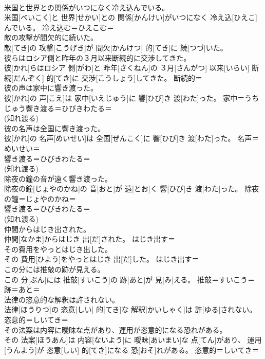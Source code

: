 \documentclass[8pt]{extreport}
\begin{document}
\begin{CJK}{UTF8}{min}
\\	米国と世界との関係がいつになく冷え込んでいる。	
\\	米国[べいこく]と 世界[せかい]との 関係[かんけい]がいつになく 冷え込[ひえこ]んでいる。	冷え込む＝ひえこむ＝ 
\\	敵の攻撃が間欠的に続いた。	
\\	敵[てき]の 攻撃[こうげき]が 間欠[かんけつ] 的[てき]に 続[つづ]いた。	
\\	彼らはロシア側と昨年の３月以来断続的に交渉してきた。	
\\	彼[かれ]らはロシア 側[がわ]と 昨年[さくねん]の ３月[さんがつ] 以来[いらい] 断続[だんぞく] 的[てき]に 交渉[こうしょう]してきた。	断続的＝ 
\\	彼の声は家中に響き渡った。	
\\	彼[かれ]の 声[こえ]は 家中[いえじゅう]に 響[ひび]き 渡[わた]った。	家中＝うちじゅう響き渡る＝ひびきわたる＝ 
\\	(知れ渡る)
\\	彼の名声は全国に響き渡った。	
\\	彼[かれ]の 名声[めいせい]は 全国[ぜんこく]に 響[ひび]き 渡[わた]った。	名声＝めいせい＝ 
\\	響き渡る＝ひびきわたる＝ 
\\	(知れ渡る)
\\	除夜の鐘の音が遠く響き渡った。	
\\	除夜の鐘[じょやのかね]の 音[おと]が 遠[とお]く 響[ひび]き 渡[わた]った。	除夜の鐘＝じょやのかね＝ 
\\	響き渡る＝ひびきわたる＝ 
\\	(知れ渡る)
\\	仲間からはじき出された。	
\\	仲間[なかま]からはじき 出[だ]された。	はじき出す＝ 
\\	その費用をやっとはじき出した。	
\\	その 費用[ひよう]をやっとはじき 出[だ]した。	はじき出す＝ 
\\	この分には推敲の跡が見える。	
\\	この 分[ぶん]には 推敲[すいこう]の 跡[あと]が 見[み]える。	推敲＝すいこう＝ 
\\	跡＝あと＝ 
\\	法律の恣意的な解釈は許されない。	
\\	法律[ほうりつ]の 恣意[しい] 的[てき]な 解釈[かいしゃく]は 許[ゆる]されない。	恣意的＝しいてき＝ 
\\	その法案は内容に曖昧な点があり、運用が恣意的になる恐れがある。	
\\	その 法案[ほうあん]は 内容[ないよう]に 曖昧[あいまい]な 点[てん]があり、 運用[うんよう]が 恣意[しい] 的[てき]になる 恐[おそ]れがある。	恣意的＝しいてき＝ 

\end{CJK}
\end{document}
